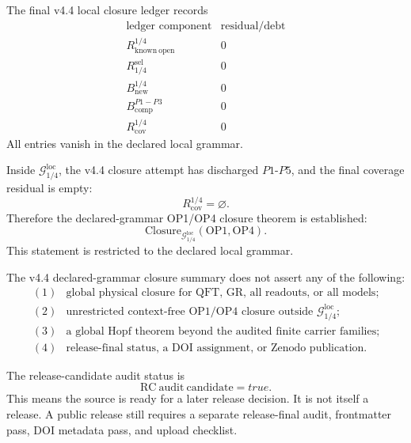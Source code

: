 \begin{proposition}
The final v4.4 local closure ledger records
\[
\begin{array}{c|r}
\text{ledger component} & \text{residual/debt}\\
\hline
R_{\mathrm{known\ open}}^{1/4} & 0\\
R_{1/4}^{\mathrm{sel}} & 0\\
B_{\mathrm{new}}^{1/4} & 0\\
B_{\mathrm{comp}}^{P1-P3} & 0\\
R_{\mathrm{cov}}^{1/4} & 0
\end{array}
\]
All entries vanish in the declared local grammar.
\end{proposition}

\begin{theorem}
Inside \(\mathcal G_{1/4}^{\mathrm{loc}}\), the v4.4 closure attempt has
discharged \(P1\)-\(P5\), and the final coverage residual is empty:
\[
    R_{\mathrm{cov}}^{1/4}=\varnothing.
\]
Therefore the declared-grammar OP1/OP4 closure theorem is established:
\[
    \mathrm{Closure}_{\mathcal G_{1/4}^{\mathrm{loc}}}(\mathrm{OP1},\mathrm{OP4}).
\]
This statement is restricted to the declared local grammar.
\end{theorem}

\begin{remark}
The v4.4 declared-grammar closure summary does not assert any of the following:
\[
\begin{array}{ll}
(1) & \text{global physical closure for QFT, GR, all readouts, or all models;}\\
(2) & \text{unrestricted context-free OP1/OP4 closure outside }
      \mathcal G_{1/4}^{\mathrm{loc}};\\
(3) & \text{a global Hopf theorem beyond the audited finite carrier families;}\\
(4) & \text{release-final status, a DOI assignment, or Zenodo publication.}
\end{array}
\]
\end{remark}

\begin{proposition}
The release-candidate audit status is
\[
    \mathrm{RC\ audit\ candidate}=true.
\]
This means the source is ready for a later release decision.  It is not itself
a release.  A public release still requires a separate release-final audit,
frontmatter pass, DOI metadata pass, and upload checklist.
\end{proposition}



